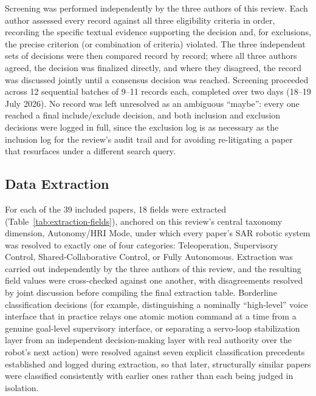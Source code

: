 \documentclass[journal]{IEEEtran}
\begin{document}
Screening was performed independently by the three authors of this review. Each author assessed every record against all three eligibility criteria in order, recording the specific textual evidence supporting the decision and, for exclusions, the precise criterion (or combination of criteria) violated. The three independent sets of decisions were then compared record by record; where all three authors agreed, the decision was finalized directly, and where they disagreed, the record was discussed jointly until a consensus decision was reached. Screening proceeded across 12 sequential batches of 9--11 records each, completed over two days (18--19 July 2026). No record was left unresolved as an ambiguous ``maybe'': every one reached a final include/exclude decision, and both inclusion and exclusion decisions were logged in full, since the exclusion log is as necessary as the inclusion log for the review's audit trail and for avoiding re-litigating a paper that resurfaces under a different search query.

\subsection{Data Extraction}

For each of the 39 included papers, 18 fields were extracted (Table~\ref{tab:extraction-fields}), anchored on this review's central taxonomy dimension, Autonomy/HRI Mode, under which every paper's SAR robotic system was resolved to exactly one of four categories: Teleoperation, Supervisory Control, Shared-Collaborative Control, or Fully Autonomous. Extraction was carried out independently by the three authors of this review, and the resulting field values were cross-checked against one another, with disagreements resolved by joint discussion before compiling the final extraction table. Borderline classification decisions (for example, distinguishing a nominally ``high-level'' voice interface that in practice relays one atomic motion command at a time from a genuine goal-level supervisory interface, or separating a servo-loop stabilization layer from an independent decision-making layer with real authority over the robot's next action) were resolved against seven explicit classification precedents established and logged during extraction, so that later, structurally similar papers were classified consistently with earlier ones rather than each being judged in isolation.
\end{document}

